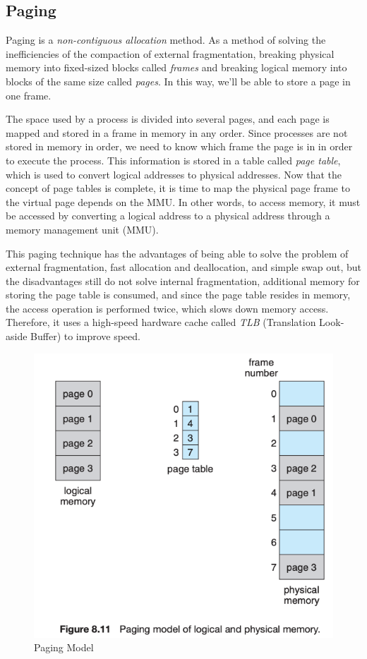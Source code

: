 \documentclass{homework}
\begin{document}
\subsection{Paging}
Paging is a \textit{non-contiguous allocation} method. As a method of solving the inefficiencies of the compaction of external fragmentation, breaking physical memory into fixed-sized blocks called \textit{frames} and breaking logical memory into blocks of the same size called \textit{pages}. In this way, we'll be able to store a page in one frame. 

The space used by a process is divided into several pages, and each page is mapped and stored in a frame in memory in any order. Since processes are not stored in memory in order, we need to know which frame the page is in in order to execute the process. This information is stored in a table called \textit{page table}, which is used to convert logical addresses to physical addresses. Now that the concept of page tables is complete, it is time to map the physical page frame to the virtual page depends on the MMU. In other words, to access memory, it must be accessed by converting a logical address to a physical address through a memory management unit (MMU).

This paging technique has the advantages of being able to solve the problem of external fragmentation, fast allocation and deallocation, and simple swap out, but the disadvantages still do not solve internal fragmentation, additional memory for storing the page table is consumed, and since the page table resides in memory, the access operation is performed twice, which slows down memory access. Therefore, it uses a high-speed hardware cache called \textit{TLB} (Translation Look-aside Buffer) to improve speed.

\begin{figure}[h]
\begin{center}
\includegraphics[scale=0.7]{33.png}    
\caption{Paging Model}
\end{center}
\end{figure}
\pagebreak
\end{document}

